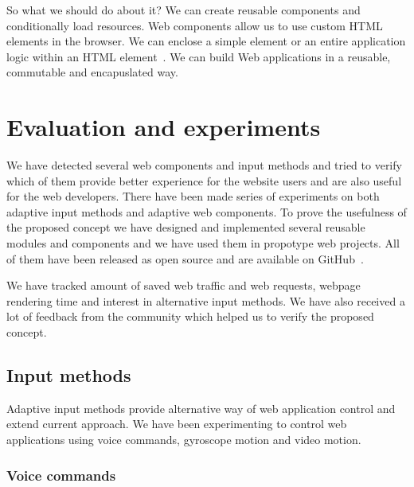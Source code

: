 \documentclass{iitsrc}
\begin{document}
So what we should do about it? We can create reusable components and conditionally load resources. Web components allow us to use custom HTML elements in the browser. We can enclose a simple element or an entire application logic within an HTML element~\cite{webcomponents}. We can build Web applications in a reusable, commutable and encapuslated way.


\section{Evaluation and experiments} %
\label{sec:evaluation_and_experiments}

We have detected several web components and input methods and tried to verify which of them provide better experience for the website users and are also useful for the web developers. There have been made series of experiments on both adaptive input methods and adaptive web components. To prove the usefulness of the proposed concept we have designed and implemented several reusable modules and components and we have used them in propotype web projects. All of them have been released as open source and are available on GitHub~\footnotemark.


We have tracked amount of saved web traffic and web requests, webpage rendering time and interest in alternative input methods. We have also received a lot of feedback from the community which helped us to verify the proposed concept.

\subsection{Input methods} %
\label{sub:input_methods}

Adaptive input methods provide alternative way of web application control and extend current approach. We have been experimenting to control web applications using voice commands, gyroscope motion and video motion.

\subsubsection*{Voice commands} %
\label{ssub:voice_commands}
\end{document}
